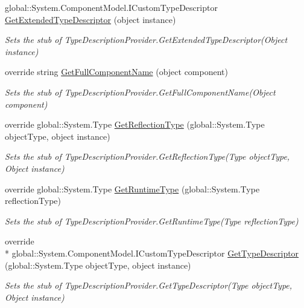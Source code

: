 \begin{DoxyCompactItemize}
global\-::\-System.\-Component\-Model.\-I\-Custom\-Type\-Descriptor \hyperlink{class_system_1_1_component_model_1_1_fakes_1_1_stub_type_description_provider_a2974ad7b99d0ee9b9fefca144a3dc621}{Get\-Extended\-Type\-Descriptor} (object instance)
\begin{DoxyCompactList}\small\item\em Sets the stub of Type\-Description\-Provider.\-Get\-Extended\-Type\-Descriptor(\-Object instance)\end{DoxyCompactList}\item 
override string \hyperlink{class_system_1_1_component_model_1_1_fakes_1_1_stub_type_description_provider_aba5d9c26371a65ae3212d9ebde5fc4df}{Get\-Full\-Component\-Name} (object component)
\begin{DoxyCompactList}\small\item\em Sets the stub of Type\-Description\-Provider.\-Get\-Full\-Component\-Name(\-Object component)\end{DoxyCompactList}\item 
override global\-::\-System.\-Type \hyperlink{class_system_1_1_component_model_1_1_fakes_1_1_stub_type_description_provider_a2e266fdaf637b8a425fdbb911dea1b0f}{Get\-Reflection\-Type} (global\-::\-System.\-Type object\-Type, object instance)
\begin{DoxyCompactList}\small\item\em Sets the stub of Type\-Description\-Provider.\-Get\-Reflection\-Type(\-Type object\-Type, Object instance)\end{DoxyCompactList}\item 
override global\-::\-System.\-Type \hyperlink{class_system_1_1_component_model_1_1_fakes_1_1_stub_type_description_provider_a946a80d536436fb5e380e950f27eaaa9}{Get\-Runtime\-Type} (global\-::\-System.\-Type reflection\-Type)
\begin{DoxyCompactList}\small\item\em Sets the stub of Type\-Description\-Provider.\-Get\-Runtime\-Type(\-Type reflection\-Type)\end{DoxyCompactList}\item 
override \\*
global\-::\-System.\-Component\-Model.\-I\-Custom\-Type\-Descriptor \hyperlink{class_system_1_1_component_model_1_1_fakes_1_1_stub_type_description_provider_a7218ea2ec38974076e6f8ebaf8226db7}{Get\-Type\-Descriptor} (global\-::\-System.\-Type object\-Type, object instance)
\begin{DoxyCompactList}\small\item\em Sets the stub of Type\-Description\-Provider.\-Get\-Type\-Descriptor(\-Type object\-Type, Object instance)\end{DoxyCompactList}\item 

\end{DoxyCompactItemize}
